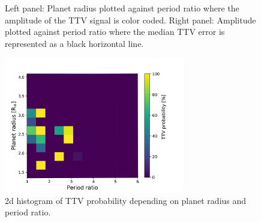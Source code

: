 \documentclass[12pt]{report}
\begin{document}
\begin{figure}
\begin{minipage}{.5\textwidth}
\end{minipage}
\caption{Left panel: Planet radius plotted against period ratio where the amplitude of the TTV signal is color coded. Right panel: Amplitude plotted against period ratio where the median TTV error is represented as a black horizontal line.}
\label{fig:CHEOPS_perRatio}
\end{figure}

\begin{figure}
\centering
\includegraphics[width=0.7\textwidth]{img/2dhist3_new.pdf}
\caption{2d histogram of TTV probability depending on planet radius and period ratio.}
\label{fig:CHEOPS_prob}
\end{figure}

\end{document}
